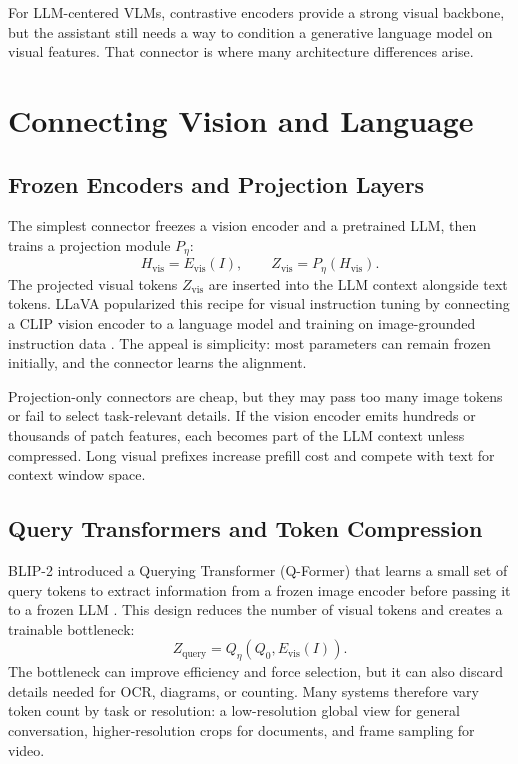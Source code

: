 For LLM-centered VLMs, contrastive encoders provide a strong visual backbone, but the assistant still needs a way to condition a generative language model on visual features. That connector is where many architecture differences arise.

\section{Connecting Vision and Language}
\subsection{Frozen Encoders and Projection Layers}
The simplest connector freezes a vision encoder and a pretrained LLM, then trains a projection module $P_\eta$:
\[
    H_{\mathrm{vis}} = E_{\mathrm{vis}}(I),
    \qquad
    Z_{\mathrm{vis}} = P_\eta(H_{\mathrm{vis}}).
\]
The projected visual tokens $Z_{\mathrm{vis}}$ are inserted into the LLM context alongside text tokens. LLaVA popularized this recipe for visual instruction tuning by connecting a CLIP vision encoder to a language model and training on image-grounded instruction data \cite{liu2023visual}. The appeal is simplicity: most parameters can remain frozen initially, and the connector learns the alignment.

Projection-only connectors are cheap, but they may pass too many image tokens or fail to select task-relevant details. If the vision encoder emits hundreds or thousands of patch features, each becomes part of the LLM context unless compressed. Long visual prefixes increase prefill cost and compete with text for context window space.

\subsection{Query Transformers and Token Compression}
BLIP-2 introduced a Querying Transformer (Q-Former) that learns a small set of query tokens to extract information from a frozen image encoder before passing it to a frozen LLM \cite{li2023blip2}. This design reduces the number of visual tokens and creates a trainable bottleneck:
\[
    Z_{\mathrm{query}} = Q_\eta(Q_0, E_{\mathrm{vis}}(I)).
\]
The bottleneck can improve efficiency and force selection, but it can also discard details needed for OCR, diagrams, or counting. Many systems therefore vary token count by task or resolution: a low-resolution global view for general conversation, higher-resolution crops for documents, and frame sampling for video.

